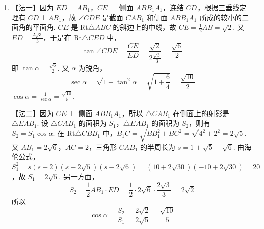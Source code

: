 \documentclass[UTF8,a4paper,oneside,11pt]{ctexbook}
\begin{document}
\begin{problem}
\begin{solution}
\begin{enumerate}
【法二】同【证法一】至 \(ED\) 是 \(CE\) 和 \(AB_{1}\) 所在的异面直线的距离. 过 \(B\) 作 \(BF\perp AB_{1}\)，垂足为 \(F\)，则 \(ED\parallel BF\)，又 \(E\) 是 \(AB\) 的中点，因此 \(ED=\frac{1}{2}BF\). 在 \(\mathrm{Rt}\triangle ABB_{1}\) 中，\(BF\cdot AB_{1}=AB\cdot BB_{1}\)，即 \(BF=\frac{AB\cdot BB_{1}}{AB_{1}}\). 因为 \(AC=BC=2\)，\(\angle ACB=90^{\circ}\)，所以 \(AB=2\sqrt{2}\). 又 \(BB_{1}=4\)，\(AB_{1}=2\sqrt{6}\)，故
\[
ED=\frac{1}{2}BF=\frac{1}{2}\frac{2\sqrt{2}\cdot4}{2\sqrt{6}}=\frac{2\sqrt{3}}{3}\mathrm{~cm}
\]

\item 【法一】因为 \(ED\perp AB_{1}\)，\(CE\perp\) 侧面 \(ABB_{1}A_{1}\)，连结 \(CD\)，根据三垂线定理有 \(CD\perp AB_{1}\)，故 \(\angle CDE\) 是截面 \(CAB_{1}\) 和侧面 \(ABB_{1}A_{1}\) 所成的较小的二面角的平面角. \(CE\) 是 \(\mathrm{Rt}\triangle ABC\) 的斜边上的中线，故 \(CE=\frac{1}{2}AB=\sqrt{2}\). 又 \(ED=\frac{2\sqrt{3}}{3}\)，于是在 \(\mathrm{Rt}\triangle CED\) 中，
\[
\tan\angle CDE=\frac{CE}{ED}=\frac{\sqrt{2}}{2\frac{\sqrt{3}}{3}}=\frac{\sqrt{6}}{2}
\]
即 \(\tan\alpha=\frac{\sqrt{6}}{2}\). 又 \(\alpha\) 为锐角，
\[
\sec\alpha=\sqrt{1+\tan^{2}\alpha}=\sqrt{1+\frac{6}{4}}=\frac{\sqrt{10}}{2}
\]
\(\cos\alpha=\frac{1}{\sec\alpha}=\frac{\sqrt{10}}{5}\).

【法二】因为 \(CE\perp\) 侧面 \(ABB_{1}A_{1}\)，所以 \(\triangle CAB_{1}\) 在侧面上的射影是 \(\triangle EAB_{1}\). 设 \(\triangle CAB_{1}\) 的面积为 \(S_{1}\)，\(\triangle EAB_{1}\) 的面积为 \(S_{2}\)，则有 \(S_{2}=S_{1}\cos\alpha\). 在 \(\mathrm{Rt}\triangle CBB_{1}\) 中，\(B_{1}C=\sqrt{BB_{1}^{2}+BC^{2}}=\sqrt{4^{2}+2^{2}}=2\sqrt{5}\). 又 \(AB_{1}=2\sqrt{6}\)，\(AC=2\)，三角形 \(CAB_{1}\) 的半周长为 \(s=1+\sqrt{5}+\sqrt{6}\). 由海伦公式，\(S_{1}^{2}=s(s-2)(s-2\sqrt{5})(s-2\sqrt{6})=(10+2\sqrt{30})(-10+2\sqrt{30})=20\)，故 \(S_{1}=2\sqrt{5}\). 另一方面，
\[
S_{2}=\frac{1}{2}AB_{1}\cdot ED=\frac{1}{2}\cdot2\sqrt{6}\cdot\frac{2\sqrt{3}}{3}=2\sqrt{2}
\]
所以
\[
\cos\alpha=\frac{S_{2}}{S_{1}}=\frac{2\sqrt{2}}{2\sqrt{5}}=\frac{\sqrt{10}}{5}
\]
\end{enumerate}
\end{solution}

\end{problem}

\end{document}
